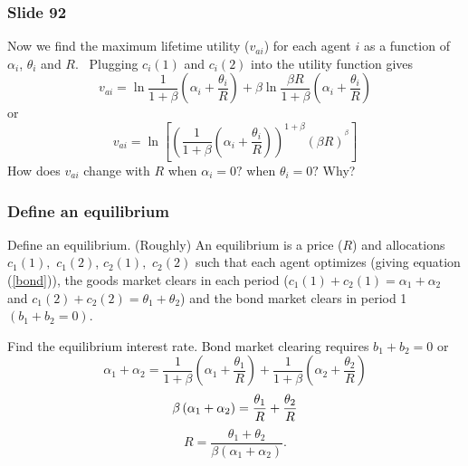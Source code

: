 \documentclass[aspectratio=169]{ltx-talk}
\begin{document}
\begin{frame}
\frametitle{Slide 92}
Now we find the maximum lifetime utility ($v_{ai}$) for each agent $i$ as a
function of $\alpha _{i}$, $\theta _{i}$ and $R$. \ Plugging $c_{i}\left(
1\right) $ and $c_{i}\left( 2\right) $ into the utility function gives%
\begin{equation*}
v_{ai}=\ln \frac{1}{1+\beta }\left( \alpha _{i}+\frac{\theta _{i}}{R}\right)
+\beta \ln \frac{\beta R}{1+\beta }\left( \alpha _{i}+\frac{\theta _{i}}{R}%
\right)
\end{equation*}%
or%
\begin{equation*}
v_{ai}=\ln \left[ \left( \frac{1}{1+\beta }\left( \alpha _{i}+\frac{\theta
_{i}}{R}\right) \right) ^{1+\beta }\left( \beta R\right) ^{^{\beta }}\right]
\end{equation*}%
How does $v_{ai}$ change with $R$ when $\alpha _{i}=0?$ when $\theta _{i}=0?$
Why?
\end{frame}

\begin{frame}
\frametitle{Define an equilibrium}
Define an equilibrium. \newline
(Roughly) An equilibrium is a price ($R$) and allocations $c_{1}\left(
1\right) ,$ $c_{1}\left( 2\right) $, $c_{2}\left( 1\right) ,$ $c_{2}\left(
2\right) $ such that each agent optimizes (giving equation (\ref{bond})),
the goods market clears in each period ($c_{1}\left( 1\right) +c_{2}\left(
1\right) =\alpha _{1}+\alpha _{2}$ and $c_{1}\left( 2\right) +c_{2}\left(
2\right) =\theta _{1}+\theta _{2}$) and the bond market clears in period 1 $%
\left( b_{1}+b_{2}=0\right) .$

Find the equilibrium interest rate. Bond market clearing requires $%
b_{1}+b_{2}=0$ or 
\begin{equation*}
\alpha _{1}+\alpha _{2}=\frac{1}{1+\beta }\left( \alpha _{1}+\frac{\theta
_{1}}{R}\right) +\frac{1}{1+\beta }\left( \alpha _{2}+\frac{\theta _{2}}{R}%
\right)
\end{equation*}%
\begin{equation*}
\beta \left( \alpha _{1}+\alpha _{2}\right) =\frac{\theta _{1}}{R}+\frac{%
\theta _{2}}{R}
\end{equation*}%
\begin{equation*}
R=\frac{\theta _{1}+\theta _{2}}{\beta \left( \alpha _{1}+\alpha _{2}\right) 
}.
\end{equation*}
\end{frame}
\end{document}
